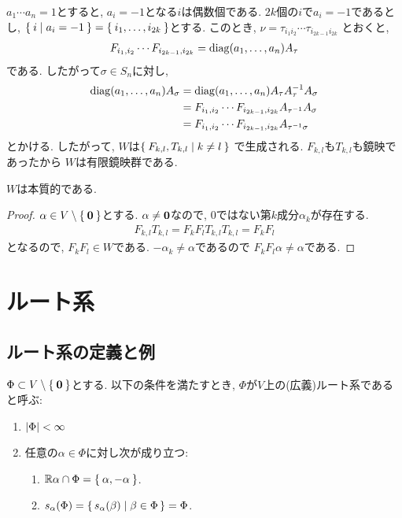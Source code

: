 $a_1\cdots a_n = 1$とすると,
$a_i=-1$となる$i$は偶数個である.
$2k$個の$i$で$a_i=-1$であるとし,
$\Set{i|a_i=-1}=\Set{i_1,\ldots,i_{2k}}$とする.
このとき, $\nu=\tau_{i_1i_2}\cdots \tau_{i_{2k-1}i_{2k}}$
とおくと,
\begin{align*}
F_{i_1,i_2}\cdots F_{i_{2k-1},i_{2k}}=\operatorname{diag}(a_1,\ldots,a_n)A_{\tau}
\end{align*}
である.  したがって$\sigma\in S_n$に対し,
\begin{align*}
  \operatorname{diag}(a_1,\ldots,a_n)A_{\sigma}
  &=\operatorname{diag}(a_1,\ldots,a_n)A_{\tau}A_{\tau}^{-1} A_{\sigma}\\
  &=F_{i_1,i_2}\cdots F_{i_{2k-1},i_{2k}}A_{\tau^{-1}} A_{\sigma}\\
  &=F_{i_1,i_2}\cdots F_{i_{2k-1},i_{2k}}A_{\tau^{-1}\sigma}
\end{align*}
とかける.
したがって, $W$は$\Set{F_{k,l}, T_{k,l}|k\neq l}$
で生成される.
$F_{k,l}$も$T_{k,l}$も鏡映であったから
$W$は有限鏡映群である.


\begin{prop}
$W$は本質的である.
\end{prop}
\begin{proof}
  $\alpha\in V\setminus\Set{\boldsymbol{0}}$とする.
  $\alpha\neq \boldsymbol{0}$なので,
  $0$ではない第$k$成分$\alpha_k$が存在する.
  \begin{align*}
    F_{k,l}T_{k,l}=F_kF_lT_{k,l}T_{k,l}=F_{k}F_{l}
  \end{align*}
  となるので,
  $F_{k}F_{l}\in W$である.
  $-\alpha_k\neq \alpha$であるので
  $F_{k}F_{l}\alpha \neq \alpha$である.
\end{proof}


\chapter{ルート系}
\section{ルート系の定義と例}
\begin{definition}
  $\Phi \subset V \setminus \Set{\boldsymbol{0}}$とする.
  以下の条件を満たすとき, $\Phi$が$V$上の(広義)ルート系であると呼ぶ:
  \begin{enumerate}
  \item $\left|\Phi\right|<\infty$
  \item 任意の$\alpha \in \Phi$に対し次が成り立つ:
    \begin{enumerate}
    \item $\mathbb{R}\alpha \cap \Phi = \Set{\alpha,-\alpha}$.
    \item $s_\alpha (\Phi) = \set{s_\alpha(\beta)|\beta\in \Phi}=\Phi$.
    \end{enumerate}
  \end{enumerate}
\end{definition}

